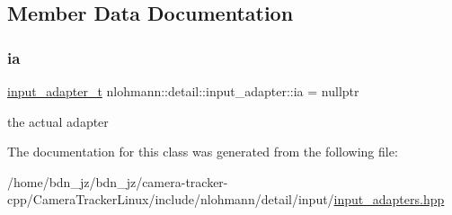 \subsection{Member Data Documentation}
\mbox{\label{classnlohmann_1_1detail_1_1input__adapter_ad5a11d0b65b68f6950cfbe8c8366b7da}} 
\subsubsection{\texorpdfstring{ia}{ia}}
{\footnotesize\ttfamily \hyperlink{namespacenlohmann_1_1detail_ae132f8cd5bb24c5e9b40ad0eafedf1c2}{input\+\_\+adapter\+\_\+t} nlohmann\+::detail\+::input\+\_\+adapter\+::ia = nullptr\hspace{0.3cm}{\ttfamily [private]}}



the actual adapter 



The documentation for this class was generated from the following file\+:\begin{DoxyCompactItemize}
\item 
/home/bdn\+\_\+jz/bdn\+\_\+jz/camera-\/tracker-\/cpp/\+Camera\+Tracker\+Linux/include/nlohmann/detail/input/\hyperlink{input__adapters_8hpp}{input\+\_\+adapters.\+hpp}\end{DoxyCompactItemize}
